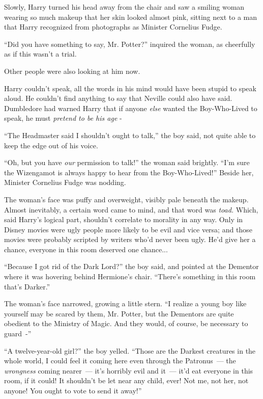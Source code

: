 Slowly, Harry turned his head away from the chair and saw a smiling woman wearing so much makeup that her skin looked almost pink, sitting next to a man that Harry recognized from photographs as Minister Cornelius Fudge.

``Did you have something to say, Mr. Potter?'' inquired the woman, as cheerfully as if this wasn't a trial.

Other people were also looking at him now.

Harry couldn't speak, all the words in his mind would have been stupid to speak aloud. He couldn't find anything to say that Neville could also have said. Dumbledore had warned Harry that if anyone \emph{else} wanted the Boy-Who-Lived to speak, he must \emph{pretend to be his age} -

``The Headmaster said I shouldn't ought to talk,'' the boy said, not quite able to keep the edge out of his voice.

``Oh, but you have \emph{our} permission to talk!'' the woman said brightly. ``I'm sure the Wizengamot is always happy to hear from the Boy-Who-Lived!'' Beside her, Minister Cornelius Fudge was nodding.

The woman's face was puffy and overweight, visibly pale beneath the makeup. Almost inevitably, a certain word came to mind, and that word was \emph{toad.} Which, said Harry's logical part, shouldn't correlate to morality in any way. Only in Disney movies were ugly people more likely to be evil and vice versa; and those movies were probably scripted by writers who'd never been ugly. He'd give her a chance, everyone in this room deserved one chance...

``Because I got rid of the Dark Lord?'' the boy said, and pointed at the Dementor where it was hovering behind Hermione's chair. ``There's something in this room that's Darker.''

The woman's face narrowed, growing a little stern. ``I realize a young boy like yourself may be scared by them, Mr. Potter, but the Dementors are quite obedient to the Ministry of Magic. And they would, of course, be necessary to guard~-''

``A twelve-year-old girl?'' the boy yelled. ``Those are the Darkest creatures in the whole world, I could feel it coming here even through the Patronus~--- the \emph{wrongness} coming nearer~--- it's horribly evil and it~--- it'd eat everyone in this room, if it could! It shouldn't be let near any child, ever! Not me, not her, not anyone! You ought to vote to send it away!''

